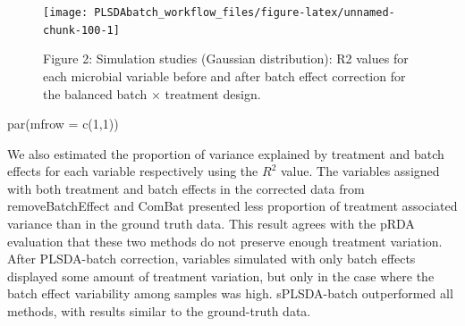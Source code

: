 \documentclass[
]{book}
\newenvironment{Shaded}{\begin{snugshade}}{\end{snugshade}}
\newcommand{\AttributeTok}[1]{\textcolor[rgb]{0.77,0.63,0.00}{#1}}
\newcommand{\DecValTok}[1]{\textcolor[rgb]{0.00,0.00,0.81}{#1}}
\newcommand{\FunctionTok}[1]{\textcolor[rgb]{0.00,0.00,0.00}{#1}}
\newcommand{\NormalTok}[1]{#1}
\begin{document}
\begin{figure}

{\centering \texttt{[image: PLSDAbatch\_workflow\_files/figure-latex/unnamed-chunk-100-1]} 

}

\caption{Figure 2: Simulation studies (Gaussian distribution): R2 values for each microbial variable before and after batch effect correction for the balanced batch × treatment design.}\label{fig:unnamed-chunk-100}
\end{figure}

\begin{Shaded}
\begin{Highlighting}[]
\FunctionTok{par}\NormalTok{(}\AttributeTok{mfrow =} \FunctionTok{c}\NormalTok{(}\DecValTok{1}\NormalTok{,}\DecValTok{1}\NormalTok{))}
\end{Highlighting}
\end{Shaded}

We also estimated the proportion of variance explained by treatment and batch effects for each variable respectively using the \(R^2\) value. The variables assigned with both treatment and batch effects in the corrected data from removeBatchEffect and ComBat presented less proportion of treatment associated variance than in the ground truth data. This result agrees with the pRDA evaluation that these two methods do not preserve enough treatment variation. After PLSDA-batch correction, variables simulated with only batch effects displayed some amount of treatment variation, but only in the case where the batch effect variability among samples was high. sPLSDA-batch outperformed all methods, with results similar to the ground-truth data.
\end{document}

